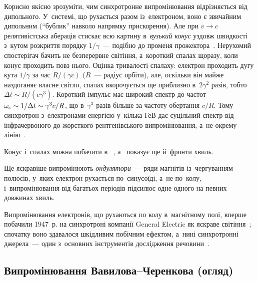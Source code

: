 Корисно якісно зрозуміти, чим синхротронне випромінювання відрізняється від дипольного. У~системі,
що рухається разом із~електроном, воно є звичайним дипольним (\enquote{бублик} навколо напрямку прискорення). Але
при $v\to c$ релятивістська аберація стискає всю картину в~\emph{вузький конус} уздовж швидкості
з~кутом розкриття порядку $1/\gamma$~--- подібно до променя прожектора~\cite{Wiedemann2015ParticleAccel}. Нерухомий спостерігач
бачить не безперервне світіння, а~короткий спалах щоразу, коли конус
проходить повз нього. Оцінка тривалості спалаху: електрон проходить дугу кута $1/\gamma$ за
час $R/(\gamma c)$ ($R$~--- радіус орбіти), але, оскільки він майже наздоганяє власне світло, спалах
вкорочується ще приблизно в~$2\gamma^2$ разів, тобто $\Delta t\sim R/(c\gamma^3)$. Короткий імпульс має
широкий спектр до частот $\omega_{\rm c}\sim1/\Delta t\sim\gamma^3c/R$, що в~$\gamma^3$ разів більше
за частоту обертання $c/R$. Тому синхротрон з~електронами енергією у~кілька ГеВ дає суцільний
спектр від інфрачервоного до жорсткого рентгенівського випромінювання, а~не окрему лінію~\cite{Elder1947, Wiedemann2015ParticleAccel}.

\begin{Simulation}
Конус і~спалах можна побачити в~
, а~
 показує ще й~фронти хвиль.
\end{Simulation}

Ще яскравіше випромінюють \emph{ондулятори}~--- ряди магнітів із~чергуванням полюсів, у~яких
електрон рухається по~синусоїді, а~не по~колу, і~випромінювання від багатьох періодів
підсилює одне одного на певних довжинах хвиль.

\begin{Historical}
	Випромінювання електронів, що рухаються по колу в~магнітному полі, вперше побачили 1947~р. на
	синхротроні компанії General Electric як яскраве світіння~\cite{Elder1947}; спочатку воно здавалося шкідливим
	побічним ефектом, а~нині синхротронні джерела~--- один з~основних інструментів дослідження речовини~\cite{Elder1948}.
\end{Historical}


\subsection*{Випромінювання Вавилова--Черенкова (огляд)}

